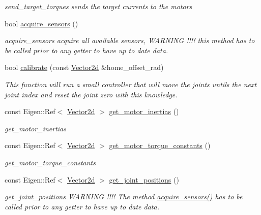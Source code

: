 \begin{DoxyCompactItemize}
\begin{DoxyCompactList}\small\item\em send\+\_\+target\+\_\+torques sends the target currents to the motors \end{DoxyCompactList}\item 
bool \hyperlink{classblmc__robots_1_1Teststand_a4203e25148ab5b4ddfef3b46647213c6}{acquire\+\_\+sensors} ()
\begin{DoxyCompactList}\small\item\em acquire\+\_\+sensors acquire all available sensors, W\+A\+R\+N\+I\+NG !!!! this method has to be called prior to any getter to have up to date data. \end{DoxyCompactList}\item 
bool \hyperlink{classblmc__robots_1_1Teststand_ad4660570e3e1b77717004b3ce8056faf}{calibrate} (const \hyperlink{common__header_8hpp_acb6916bc8c9fe9d98c484fd4cc201447}{Vector2d} \&home\+\_\+offset\+\_\+rad)
\begin{DoxyCompactList}\small\item\em This function will run a small controller that will move the joints untils the next joint index and reset the joint zero with this knowledge. \end{DoxyCompactList}\item 
const Eigen\+::\+Ref$<$ \hyperlink{common__header_8hpp_acb6916bc8c9fe9d98c484fd4cc201447}{Vector2d} $>$ \hyperlink{classblmc__robots_1_1Teststand_a4897109730380ae0be7da37e2bd69e81}{get\+\_\+motor\+\_\+inertias} ()
\begin{DoxyCompactList}\small\item\em get\+\_\+motor\+\_\+inertias \end{DoxyCompactList}\item 
const Eigen\+::\+Ref$<$ \hyperlink{common__header_8hpp_acb6916bc8c9fe9d98c484fd4cc201447}{Vector2d} $>$ \hyperlink{classblmc__robots_1_1Teststand_a483bc937ac8c95b93bb90c47744da2e8}{get\+\_\+motor\+\_\+torque\+\_\+constants} ()
\begin{DoxyCompactList}\small\item\em get\+\_\+motor\+\_\+torque\+\_\+constants \end{DoxyCompactList}\item 
const Eigen\+::\+Ref$<$ \hyperlink{common__header_8hpp_acb6916bc8c9fe9d98c484fd4cc201447}{Vector2d} $>$ \hyperlink{classblmc__robots_1_1Teststand_adf08db3dbb4fd8da74c8ef15fb393c1a}{get\+\_\+joint\+\_\+positions} ()
\begin{DoxyCompactList}\small\item\em get\+\_\+joint\+\_\+positions W\+A\+R\+N\+I\+NG !!!! The method \hyperlink{classblmc__robots_1_1Teststand_a4203e25148ab5b4ddfef3b46647213c6}{acquire\+\_\+sensors()} has to be called prior to any getter to have up to date data. \end{DoxyCompactList}\item 

\end{DoxyCompactItemize}
